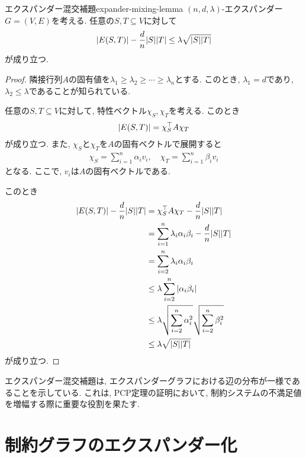\begin{lemma}{エクスパンダー混交補題}{expander-mixing-lemma}
  $(n,d,\lambda)$-エクスパンダー$G=(V,E)$を考える. 任意の$S,T\subseteq V$に対して
  \begin{align*}
    \abs{E(S,T)} - \frac{d}{n}\abs{S}\abs{T} \le \lambda\sqrt{\abs{S}\abs{T}}
  \end{align*}
  が成り立つ.
\end{lemma}

\begin{proof}
  隣接行列$A$の固有値を$\lambda_1\ge\lambda_2\ge\cdots\ge\lambda_n$とする. このとき, $\lambda_1=d$であり, $\lambda_2\le\lambda$であることが知られている.
  
  任意の$S,T\subseteq V$に対して, 特性ベクトル$\chi_S,\chi_T$を考える. このとき
  \begin{align*}
    \abs{E(S,T)} = \chi_S^\top A\chi_T
  \end{align*}
  が成り立つ. また, $\chi_S$と$\chi_T$を$A$の固有ベクトルで展開すると
  \begin{align*}
    \chi_S = \sum_{i=1}^n \alpha_i v_i, \quad \chi_T = \sum_{i=1}^n \beta_i v_i
  \end{align*}
  となる. ここで, $v_i$は$A$の固有ベクトルである.
  
  このとき
  \begin{align*}
    \abs{E(S,T)} - \frac{d}{n}\abs{S}\abs{T} &= \chi_S^\top A\chi_T - \frac{d}{n}\abs{S}\abs{T} \\
    &= \sum_{i=1}^n \lambda_i\alpha_i\beta_i - \frac{d}{n}\abs{S}\abs{T} \\
    &= \sum_{i=2}^n \lambda_i\alpha_i\beta_i \\
    &\le \lambda\sum_{i=2}^n \abs{\alpha_i\beta_i} \\
    &\le \lambda\sqrt{\sum_{i=2}^n \alpha_i^2}\sqrt{\sum_{i=2}^n \beta_i^2} \\
    &\le \lambda\sqrt{\abs{S}\abs{T}}
  \end{align*}
  が成り立つ.
\end{proof}

エクスパンダー混交補題は, エクスパンダーグラフにおける辺の分布が一様であることを示している. これは, PCP定理の証明において, 制約システムの不満足値を増幅する際に重要な役割を果たす.

\section{制約グラフのエクスパンダー化}

